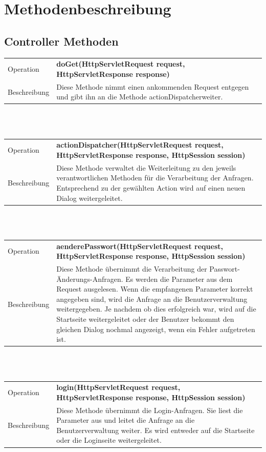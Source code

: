 \documentclass[12pt]{scrreprt}
\begin{document}
\section{Methodenbeschreibung}
\subsection{Controller Methoden}

\begin{tabular}{|lp{12cm}|}
	\hline
	Operation &  \textbf{doGet(HttpServletRequest request, HttpServletResponse response)}\\ 
	Beschreibung & Diese Methode nimmt einen ankommenden Request entgegen und gibt ihn an die Methode \glqq actionDispatcher\grqq weiter. \\ 
	\hline 
\end{tabular} \\\\

\begin{tabular}{|lp{12cm}|}
	\hline
	Operation &  \textbf{actionDispatcher(HttpServletRequest request, HttpServletResponse response, HttpSession session)}\\ 
	Beschreibung & Diese Methode verwaltet die Weiterleitung zu den jeweils verantwortlichen Methoden für die Verarbeitung der Anfragen. Entsprechend zu der gewählten Action wird auf einen neuen Dialog weitergeleitet. \\ 
	\hline 
\end{tabular} \\\\

\begin{tabular}{|lp{12cm}|}
	\hline
	Operation &  \textbf{aenderePasswort(HttpServletRequest request, HttpServletResponse response, HttpSession session) }\\ 
	Beschreibung & Diese Methode übernimmt die Verarbeitung der Passwort-Änderungs-Anfragen. Es werden die Parameter aus dem Request ausgelesen. Wenn die empfangenen Parameter  korrekt angegeben sind, wird die Anfrage an die Benutzerverwaltung weitergegeben. Je nachdem ob dies erfolgreich war, wird auf die Startseite weitergeleitet oder der Benutzer bekommt den gleichen Dialog nochmal angezeigt, wenn ein Fehler aufgetreten ist.\\ 
	\hline 
\end{tabular} \\\\

\begin{tabular}{|lp{12cm}|}
	\hline
	Operation &  \textbf{login(HttpServletRequest request, HttpServletResponse response, HttpSession session)}\\ 
	Beschreibung & Diese Methode übernimmt die Login-Anfragen. Sie liest die Parameter aus und leitet die Anfrage an die Benutzerverwaltung weiter. Es wird entweder auf die Startseite oder die Loginseite weitergeleitet. \\ 
	\hline 
\end{tabular} \\\\
\end{document}
